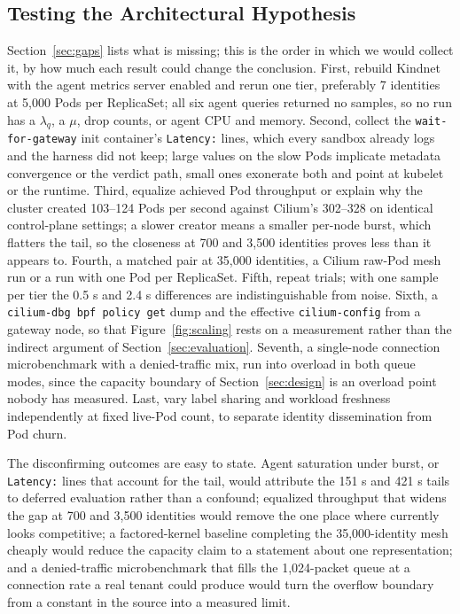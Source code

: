 \subsection{Testing the Architectural Hypothesis}

Section~\ref{sec:gaps} lists what is missing; this is the order in
which we would collect it, by how much each result could change the
conclusion. First, rebuild Kindnet with the agent metrics server
enabled and rerun one tier, preferably 7 identities at 5,000 Pods per
ReplicaSet; all six agent queries returned no samples, so no run has a
$\lambda_q$, a $\mu$, drop counts, or agent CPU and memory. Second,
collect the \texttt{wait-for-gateway} init container's
\texttt{Latency:} lines, which every sandbox already logs and the
harness did not keep; large values on the slow Pods implicate metadata
convergence or the verdict path, small ones exonerate both and point at
kubelet or the runtime. Third, equalize achieved Pod throughput or
explain why the \sys{} cluster created 103--124 Pods per second against
Cilium's 302--328 on identical control-plane settings; a slower creator
means a smaller per-node burst, which flatters the tail, so the
closeness at 700 and 3,500 identities proves less than it appears to.
Fourth, a matched pair at 35,000 identities, a Cilium raw-Pod mesh run
or a \sys{} run with one Pod per ReplicaSet. Fifth, repeat trials; with
one sample per tier the 0.5 s and 2.4 s differences are
indistinguishable from noise. Sixth, a \texttt{cilium-dbg bpf policy
get} dump and the effective \texttt{cilium-config} from a gateway node,
so that Figure~\ref{fig:scaling} rests on a measurement rather than the
indirect argument of Section~\ref{sec:evaluation}. Seventh, a
single-node connection microbenchmark with a denied-traffic mix, run
into overload in both queue modes, since the capacity boundary of
Section~\ref{sec:design} is an overload point nobody has
measured. Last, vary label sharing and workload freshness independently
at fixed live-Pod count, to separate identity dissemination from Pod
churn.

The disconfirming outcomes are easy to state. Agent saturation under
burst, or \texttt{Latency:} lines that account for the tail, would
attribute the 151 s and 421 s tails to deferred evaluation rather than
a confound; equalized throughput that widens the gap at 700 and 3,500
identities would remove the one place where \sys{} currently looks
competitive; a factored-kernel baseline completing the 35,000-identity
mesh cheaply would reduce the capacity claim to a statement about one
representation; and a denied-traffic microbenchmark that fills the
1,024-packet queue at a connection rate a real tenant could produce
would turn the overflow boundary from a constant in the source into a
measured limit.

